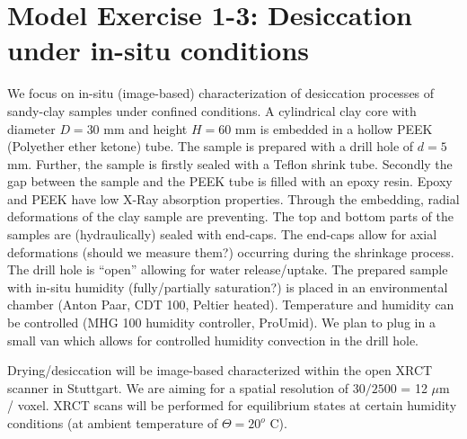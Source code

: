 \section[MEX 1-3: Desiccation under in-situ conditions]{Model Exercise 1-3: Desiccation under in-situ conditions}
\label{sec:mex12}
We focus on in-situ (image-based) characterization of desiccation processes of sandy-clay samples
under confined conditions. A cylindrical clay core with diameter $D=30$ mm and height 
$H=60$ mm is embedded in a hollow PEEK (Polyether ether ketone) tube. 
The sample is prepared with a drill hole of $d=5$ mm.
Further, the sample is firstly sealed with a Teflon shrink tube. Secondly the gap between the sample and the PEEK tube is filled with an epoxy resin.
Epoxy and PEEK have low X-Ray absorption properties. Through the embedding, radial deformations of the clay sample are preventing. The top and bottom parts of the samples are (hydraulically) sealed with end-caps. The end-caps allow for axial deformations (should we measure them?) occurring during the shrinkage process. The drill hole is ``open''  allowing for water release/uptake.
The prepared sample with in-situ humidity (fully/partially saturation?) is placed in an environmental chamber (Anton Paar, CDT 100, Peltier heated). Temperature and humidity can be controlled (MHG 100 humidity controller, ProUmid). We plan to plug in a small van which allows for controlled humidity convection in the drill hole. 

Drying/desiccation will be image-based characterized within the open XRCT scanner in Stuttgart. We are aiming for a spatial resolution of $30 / 2500$ = 12 $\mu$m / voxel. XRCT scans will be performed for equilibrium states at certain humidity conditions (at ambient temperature of $\Theta = 20^o$ C).

